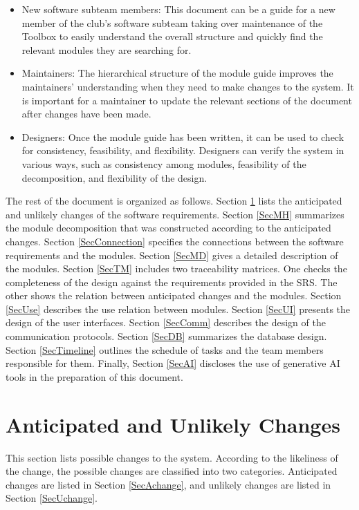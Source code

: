 \documentclass[12pt, titlepage]{article}
\begin{document}
\begin{itemize}
\item New software subteam members: This document can be a guide for a new
  member of the club's software subteam taking over maintenance of the Toolbox
  to easily understand the overall structure and quickly find the relevant
  modules they are searching for.
\item Maintainers: The hierarchical structure of the module guide improves the
  maintainers' understanding when they need to make changes to the system. It is
  important for a maintainer to update the relevant sections of the document
  after changes have been made.
\item Designers: Once the module guide has been written, it can be used to
  check for consistency, feasibility, and flexibility. Designers can verify the
  system in various ways, such as consistency among modules, feasibility of the
  decomposition, and flexibility of the design.
\end{itemize}

The rest of the document is organized as follows.
Section \ref{SecChange} lists the anticipated and unlikely changes of the software requirements.
Section \ref{SecMH} summarizes the module decomposition that was constructed according to the anticipated changes.
Section \ref{SecConnection} specifies the connections between the software requirements and the modules.
Section \ref{SecMD} gives a detailed description of the modules.
Section \ref{SecTM} includes two traceability matrices. One checks the completeness of the design against the requirements provided in the SRS. The other shows the relation between anticipated changes and the modules.
Section \ref{SecUse} describes the use relation between modules. 
Section \ref{SecUI} presents the design of the user interfaces. 
Section \ref{SecComm} describes the design of the communication protocols.
Section \ref{SecDB} summarizes the database design.
Section \ref{SecTimeline} outlines the schedule of tasks and the team members responsible for them.
Finally, Section \ref{SecAI} discloses the use of generative AI tools in the preparation of this document.




\section{Anticipated and Unlikely Changes} \label{SecChange}
This section lists possible changes to the system. According to the likeliness of the change, the possible changes are classified into two categories. Anticipated changes are listed in Section \ref{SecAchange}, and unlikely changes are listed in Section \ref{SecUchange}.
\end{document}
